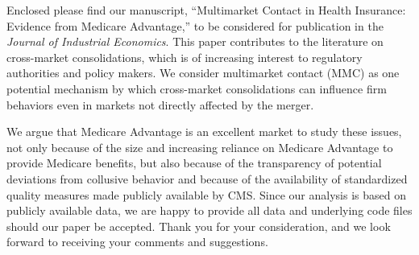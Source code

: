 \documentclass{article}
\begin{document}
Enclosed please find our manuscript, ``Multimarket Contact in Health Insurance: Evidence from Medicare Advantage,'' to be considered for publication in the \textit{Journal of Industrial Economics}. This paper contributes to the literature on cross-market consolidations, which is of increasing interest to regulatory authorities and policy makers. We consider multimarket contact (MMC) as one potential mechanism by which cross-market consolidations can influence firm behaviors even in markets not directly affected by the merger.

We argue that Medicare Advantage is an excellent market to study these issues, not only because of the size and increasing reliance on Medicare Advantage to provide Medicare benefits, but also because of the transparency of potential deviations from collusive behavior and because of the availability of standardized quality measures made publicly available by CMS. Since our analysis is based on publicly available data, we are happy to provide all data and underlying code files should our paper be accepted. Thank you for your consideration, and we look forward to receiving your comments and suggestions.
\end{document}
